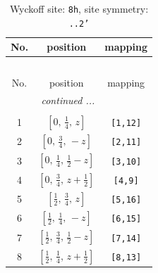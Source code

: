 \documentclass[fleqn,8pt]{jsarticle}
\begin{document}
\begin{longtable}{ccc}
\caption{Wyckoff site: {\tt 8h}, site symmetry: {\tt ..2'}}
 \\
 \hline \hline
No. & position & mapping \\ \hline \endfirsthead

\multicolumn{2}{l}{\tablename\ \thetable{}} \\
 \hline \hline
No. & position & mapping \\ \hline \endhead

 \hline \hline
\multicolumn{2}{r}{\footnotesize\it continued ...} \\ \endfoot

 \hline \hline
\multicolumn{2}{r}{} \\ \endlastfoot

1 & $\left[ 0,\, \frac{1}{4},\, z \right]$ & {\tt [1,12]} \\ \hline
2 & $\left[ 0,\, \frac{3}{4},\, - z \right]$ & {\tt [2,11]} \\ \hline
3 & $\left[ 0,\, \frac{1}{4},\, \frac{1}{2} - z \right]$ & {\tt [3,10]} \\ \hline
4 & $\left[ 0,\, \frac{3}{4},\, z + \frac{1}{2} \right]$ & {\tt [4,9]} \\ \hline
5 & $\left[ \frac{1}{2},\, \frac{3}{4},\, z \right]$ & {\tt [5,16]} \\ \hline
6 & $\left[ \frac{1}{2},\, \frac{1}{4},\, - z \right]$ & {\tt [6,15]} \\ \hline
7 & $\left[ \frac{1}{2},\, \frac{3}{4},\, \frac{1}{2} - z \right]$ & {\tt [7,14]} \\ \hline
8 & $\left[ \frac{1}{2},\, \frac{1}{4},\, z + \frac{1}{2} \right]$ & {\tt [8,13]} \\
\end{longtable}
\renewcommand{\arraystretch}{1.2}
\end{document}
